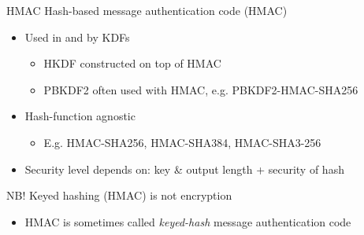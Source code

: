 \begin{frame}{HMAC}
  Hash-based message authentication code (HMAC)
  \begin{itemize}[<+(1)->]
    \item Used in and by KDFs
    \par
    \begin{itemize}
      \item HKDF constructed on top of HMAC
      \item PBKDF2 often used with HMAC, e.g. PBKDF2-HMAC-SHA256
    \end{itemize}
    \item Hash-function agnostic
    \par
    \begin{itemize}
      \item E.g. HMAC-SHA256, HMAC-SHA384, HMAC-SHA3-256
    \end{itemize}
    \item Security level depends on: key \& output length + security of hash
  \end{itemize}

  \vspace*{1em}

  \pause
  NB! Keyed hashing (HMAC) is not encryption
  \begin{itemize}
    \item HMAC is sometimes called \emph{keyed-hash} message authentication code
  \end{itemize}
\end{frame}

